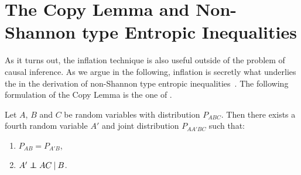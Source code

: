 {



\section{The Copy Lemma and Non-Shannon type Entropic Inequalities}\label{sec:NonShannon}

As it turns out, the inflation technique is also useful outside of the problem of causal inference. As we argue in the following, inflation is secretly what underlies the  in the derivation of non-Shannon type entropic inequalities~\cite[Chapter~15]{yeung_network_2008}. The following formulation of the Copy Lemma is the one of \citet{kaced_equivalence_2013}.

\begin{lemma}
	Let $A$, $B$ and $C$ be random variables with distribution $P_{ABC}$. Then there exists a fourth random variable $A'$ and joint distribution $P_{AA'BC}$ such that:
	\begin{enumerate}
		\item $P_{AB} = P_{A'B}$,
		\item $A' \perp\!\!\!\!\perp AC \:|\: B$.
	\label{copylemma}
	\end{enumerate}
\end{lemma}

}

